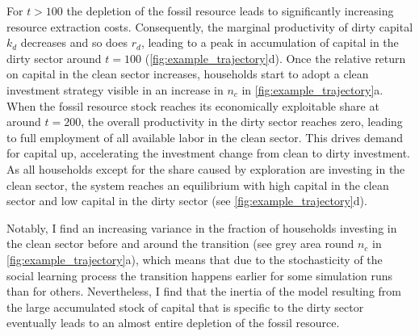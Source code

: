 For $t>100$ the depletion of the fossil resource leads to significantly increasing resource extraction costs. Consequently, the marginal productivity of dirty capital $k_d$ decreases and so does $r_d$, leading to a peak in accumulation of capital in the dirty sector around $t=100$ (\cref{fig:example_trajectory}d).
Once the relative return on capital in the clean sector increases, households start to adopt a clean investment strategy visible in an increase in $n_c$ in \cref{fig:example_trajectory}a.
When the fossil resource stock reaches its economically exploitable share at around $t=200$, the overall productivity in the dirty sector reaches zero, leading to full employment of all available labor in the clean sector.
This drives demand for capital up, accelerating the investment change from clean to dirty investment.
As all households except for the share caused by exploration are investing in the clean sector, the system reaches an equilibrium with high capital in the clean sector and low capital in the dirty sector (see \cref{fig:example_trajectory}d).

Notably, I find an increasing variance in the fraction of households investing in the clean sector before and around the transition (see grey area round $n_c$ in \cref{fig:example_trajectory}a), which means that due to the stochasticity of the social learning process the transition happens earlier for some simulation runs than for others. Nevertheless, I find that the inertia of the model resulting from the large accumulated stock of capital that is specific to the dirty sector eventually leads to an almost entire depletion of the fossil resource.

